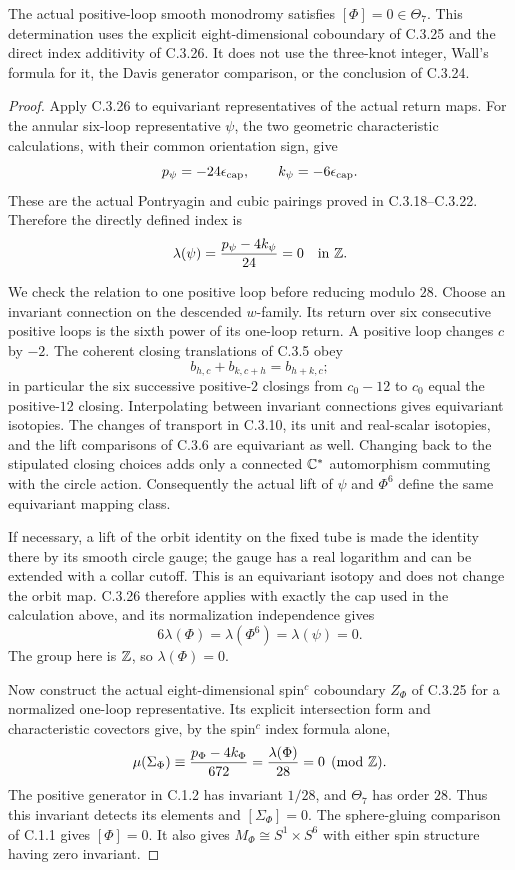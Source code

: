\begin{corollary}
The actual positive-loop smooth monodromy satisfies
$[\Phi]=0\in\Theta_7$. This determination uses the explicit
eight-dimensional coboundary of C.3.25 and the direct index
additivity of C.3.26. It does not use the three-knot integer,
Wall's formula for it, the Davis generator comparison, or the
conclusion of C.3.24.
\end{corollary}
\begin{proof}
Apply C.3.26 to equivariant representatives of the actual return
maps. For the annular six-loop representative $\psi$, the two
geometric characteristic calculations, with their common
orientation sign, give
\[
 p_\psi=-24\epsilon_{\rm cap},\qquad
 k_\psi=-6\epsilon_{\rm cap}.
\]
These are the actual Pontryagin and cubic pairings proved in
C.3.18--C.3.22. Therefore the directly defined index is
\[
 \lambda(\psi)=\frac{p_\psi-4k_\psi}{24}=0
 \quad\hbox{in }\mathbb Z.
\]

We check the relation to one positive loop before reducing
modulo $28$. Choose an invariant connection on the descended
$w$-family. Its return over six consecutive positive loops is
the sixth power of its one-loop return. A positive loop changes
$c$ by $-2$. The coherent closing translations of C.3.5 obey
\[
 b_{h,c}+b_{k,c+h}=b_{h+k,c};
\]
in particular the six successive positive-$2$ closings from
$c_0-12$ to $c_0$ equal the positive-$12$ closing. Interpolating
between invariant connections gives equivariant isotopies.
The changes of transport in C.3.10, its unit and real-scalar
isotopies, and the lift comparisons of C.3.6 are equivariant
as well. Changing back to the stipulated closing choices
adds only a connected $\mathbb C^*$ automorphism commuting with the
circle action. Consequently the actual lift of $\psi$ and
$\Phi^6$ define the same equivariant mapping class.

If necessary, a lift of the orbit identity on the fixed tube
is made the identity there by its smooth circle gauge; the
gauge has a real logarithm and can be extended with a collar
cutoff. This is an equivariant isotopy and does not change the
orbit map. C.3.26 therefore applies with exactly the cap used
in the calculation above, and its normalization independence
gives
\[
 6\lambda(\Phi)=\lambda(\Phi^6)=\lambda(\psi)=0.
\]
The group here is $\mathbb Z$, so $\lambda(\Phi)=0$.

Now construct the actual eight-dimensional spin$^c$ coboundary
$Z_\Phi$ of C.3.25 for a normalized one-loop representative.
Its explicit intersection form and characteristic covectors
give, by the spin$^c$ index formula alone,
\[
 \mu(\Sigma_\Phi)
   \equiv\frac{p_\Phi-4k_\Phi}{672}
   =\frac{\lambda(\Phi)}{28}=0\pmod{\mathbb Z}.
\]
The positive generator in C.1.2 has invariant $1/28$, and
$\Theta_7$ has order $28$. Thus this invariant detects its
elements and $[\Sigma_\Phi]=0$. The sphere-gluing comparison
of C.1.1 gives $[\Phi]=0$. It also gives
$M_\Phi\cong S^1\times S^6$ with either spin structure having
zero invariant.
\end{proof}


